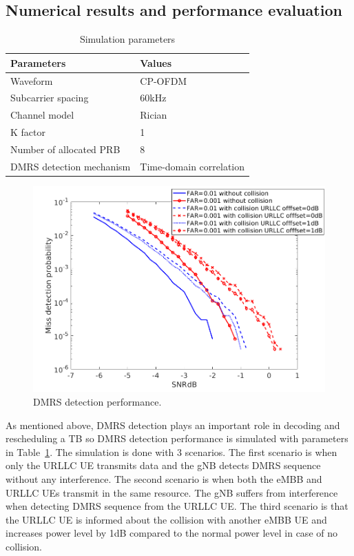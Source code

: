 \documentclass{ieeeaccess}
\begin{document}
\subsection{Numerical results and performance evaluation}

\begin{table}[htbp]
\caption{Simulation parameters}
\begin{center}
\begin{tabular}{|p{8em}|p{8em}|}
 \hline
 \textbf{Parameters} & \textbf{Values}\\
 \hline
 Waveform & CP-OFDM\\
 \hline
 Subcarrier spacing & 60kHz\\
 \hline
 Channel model & Rician\\
 \hline
 K factor & 1\\
 \hline
 Number of allocated PRB & 8\\
 \hline
 DMRS detection mechanism & Time-domain correlation\\
 

 
 \hline
\end{tabular}
\label{tab5}
\end{center}

\end{table}

\begin{figure}[htbp]
\centerline{\includegraphics[scale=0.33]{fig16.png}}
\caption{DMRS detection performance.}
\label{fig16}
\vspace{-3mm}
\end{figure}
As mentioned above, DMRS detection plays an important role in decoding and rescheduling a TB so DMRS detection performance is simulated with parameters in Table~\ref{tab5}. The simulation is done with 3 scenarios. The first scenario is when only the URLLC UE transmits data and the gNB detects DMRS sequence without any interference. The second scenario is when both the eMBB and URLLC UEs transmit in the same resource. The gNB suffers from interference when detecting DMRS sequence from the URLLC UE. The third scenario is that the URLLC UE is informed about the collision with another eMBB UE and increases power level by 1dB compared to the normal power level in case of no collision.
\end{document}
